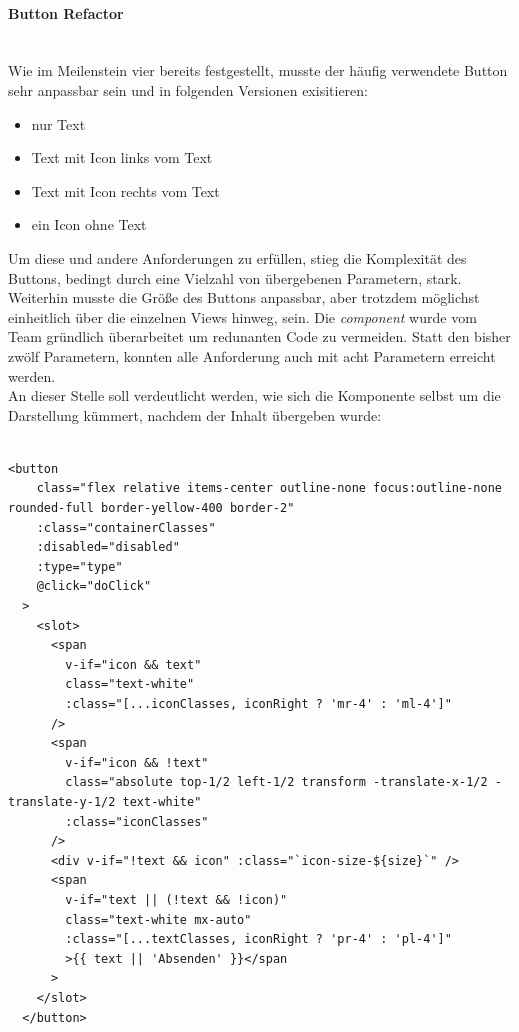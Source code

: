 \documentclass[10pt, a4paper]{article}
\begin{document}
\begin{onehalfspace}
\paragraph*{Button Refactor} $~$ \\
Wie im Meilenstein vier bereits festgestellt, musste der häufig verwendete Button sehr anpassbar sein und in folgenden Versionen exisitieren:
\begin{itemize}
  \item nur Text
  \item Text mit Icon links vom Text
  \item Text mit Icon rechts vom Text
  \item ein Icon ohne Text
\end{itemize}
Um diese und andere Anforderungen zu erfüllen, stieg die Komplexität des Buttons, bedingt durch eine Vielzahl von übergebenen Parametern, stark.
Weiterhin musste die Größe des Buttons anpassbar, aber trotzdem möglichst einheitlich über die einzelnen Views hinweg, sein. Die \textit{component} wurde vom Team gründlich überarbeitet um redunanten Code zu vermeiden. Statt den bisher zwölf Parametern, konnten alle Anforderung auch mit acht Parametern erreicht werden.
\\
An dieser Stelle soll verdeutlicht werden, wie sich die Komponente selbst um die Darstellung kümmert, nachdem der Inhalt übergeben wurde:
\\~\\
\begin{minipage}{\textwidth}
  \begin{lstlisting}[caption={Codesnippets vom Button}, captionpos=b]
    <button
    class="flex relative items-center outline-none focus:outline-none rounded-full border-yellow-400 border-2"
    :class="containerClasses"
    :disabled="disabled"
    :type="type"
    @click="doClick"
  >
    <slot>
      <span
        v-if="icon && text"
        class="text-white"
        :class="[...iconClasses, iconRight ? 'mr-4' : 'ml-4']"
      />
      <span
        v-if="icon && !text"
        class="absolute top-1/2 left-1/2 transform -translate-x-1/2 -translate-y-1/2 text-white"
        :class="iconClasses"
      />
      <div v-if="!text && icon" :class="`icon-size-${size}`" />
      <span
        v-if="text || (!text && !icon)"
        class="text-white mx-auto"
        :class="[...textClasses, iconRight ? 'pr-4' : 'pl-4']"
        >{{ text || 'Absenden' }}</span
      >
    </slot>
  </button>
  \end{lstlisting}
\end{minipage}

\end{onehalfspace}
\end{document}
